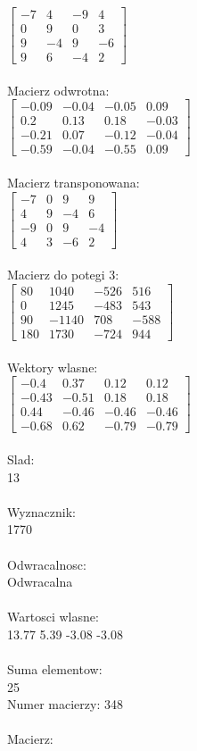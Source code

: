 \documentclass[a4paper,12pt]{article}
\begin{document}
$\begin{bmatrix} -7&4&-9&4\\0&9&0&3\\9&-4&9&-6\\9&6&-4&2 \end{bmatrix}$
\\
\\
Macierz odwrotna:\\

$\begin{bmatrix} -0.09&-0.04&-0.05&0.09\\0.2&0.13&0.18&-0.03\\-0.21&0.07&-0.12&-0.04\\-0.59&-0.04&-0.55&0.09 \end{bmatrix}$
\\
\\
Macierz transponowana:\\

$\begin{bmatrix} -7&0&9&9\\4&9&-4&6\\-9&0&9&-4\\4&3&-6&2 \end{bmatrix}$
\\
\\
Macierz do potegi 3:\\

$\begin{bmatrix} 80&1040&-526&516\\0&1245&-483&543\\90&-1140&708&-588\\180&1730&-724&944 \end{bmatrix}$
\\
\\
Wektory wlasne:\\

$\begin{bmatrix} -0.4&0.37&0.12&0.12\\-0.43&-0.51&0.18&0.18\\0.44&-0.46&-0.46&-0.46\\-0.68&0.62&-0.79&-0.79 \end{bmatrix}$
\\
\\
Slad:\\
13
\\
\\
Wyznacznik:\\
1770
\\
\\
Odwracalnosc:\\
Odwracalna
\\
\\
Wartosci wlasne:\\
13.77 5.39 -3.08 -3.08
\\
\\
Suma elementow:\\
25
\\
\newpage
Numer macierzy:
348
\\
\\
Macierz:\\
\end{document}

